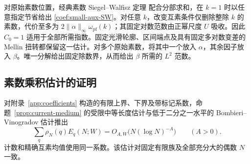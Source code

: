 对原始素数位置，经典素数 Siegel--Walfisz 定理 \cite[Exercise~64]{TaoSW} 配合分部求和，在 $k=1$ 时以任意指定节省给出 \eqref{coef:small-aux-SW}。对任意 $k$，改变互素条件仅删除整除 $k$ 的素数，代价至多为 $2\|\alpha\|_\infty\omega_{\mathrm{pf}}(k)$；其固定对数范数由正幂尺度 $U$ 吸收。因此 $C_0=1$ 适用于全部所需指数。固定光滑轮廓、区间端点及具有固定多对数变差的 Mellin 扭转都保留这一估计。对多个原始素数，将其中一个放入 $\alpha$，其余因子放入 $\beta$。唯一分解给出固定除数界，从而给出 $\beta$ 所需的 $L^2$ 范数。

\subsection{素数乘积估计的证明}

\begin{proposition}\label{coef:prime-product-insertion}
对附录~\ref{app:coefficients} 构造的有限上界、下界及带标记系数，命题~\ref{prop:current-medium} 的受限中等长度估计与低于二分之一水平的 Bombieri--Vinogradov 估计推出
\[
 \sum_q\rho_N(q)E_q(N;W)=O_{A,W}\bigl(N(\log N)^{-A}\bigr)
 \qquad(A>0).
\]
计数和精确互素均值使用同一系数。该估计对固定有限族及全部充分大的偶数 $N$ 一致。
\end{proposition}

